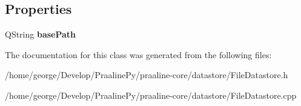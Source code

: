 \subsection*{Properties}
\begin{DoxyCompactItemize}
\item 
\mbox{\label{class_file_datastore_a7ec5358ec780ee4d8cd360741c35ea56}} 
Q\+String {\bfseries base\+Path}
\end{DoxyCompactItemize}


The documentation for this class was generated from the following files\+:\begin{DoxyCompactItemize}
\item 
/home/george/\+Develop/\+Praaline\+Py/praaline-\/core/datastore/File\+Datastore.\+h\item 
/home/george/\+Develop/\+Praaline\+Py/praaline-\/core/datastore/File\+Datastore.\+cpp\end{DoxyCompactItemize}
